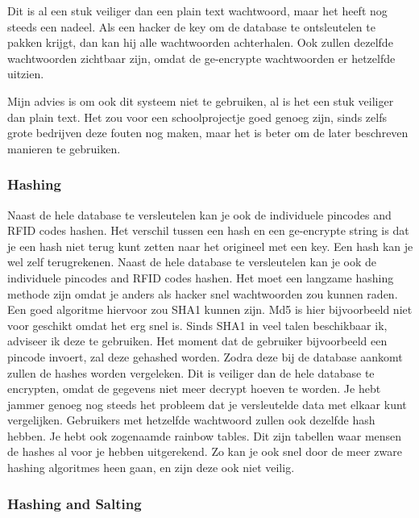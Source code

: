 \documentclass{article}
\begin{document}
Dit is al een stuk veiliger dan een plain text wachtwoord, maar het heeft nog steeds een nadeel.
Als een hacker de key om de database te ontsleutelen te pakken krijgt, dan kan hij alle wachtwoorden achterhalen.
Ook zullen dezelfde wachtwoorden zichtbaar zijn, omdat de ge-encrypte wachtwoorden er hetzelfde uitzien.

Mijn advies is om ook dit systeem niet te gebruiken, al is het een stuk veiliger dan plain text.
Het zou voor een schoolprojectje goed genoeg zijn, sinds zelfs grote bedrijven deze fouten nog maken, maar het is beter om de later beschreven manieren te gebruiken.

\newpage

\subsubsection{Hashing}

Naast de hele database te versleutelen kan je ook de individuele pincodes and RFID codes hashen.
Het verschil tussen een hash en een ge-encrypte string is dat je een hash niet terug kunt zetten naar het origineel met een key. 
Een hash kan je wel zelf terugrekenen.
Naast de hele database te versleutelen kan je ook de individuele pincodes and RFID codes hashen.
Het moet een langzame hashing methode zijn omdat je anders als hacker snel wachtwoorden zou kunnen raden.
Een goed algoritme hiervoor zou SHA1 kunnen zijn.
Md5 is hier bijvoorbeeld niet voor geschikt omdat het erg snel is.
Sinds SHA1 in veel talen beschikbaar ik, adviseer ik deze te gebruiken.
Het moment dat de gebruiker bijvoorbeeld een pincode invoert, zal deze gehashed worden.
Zodra deze bij de database aankomt zullen de hashes worden vergeleken.
Dit is veiliger dan de hele database te encrypten, omdat de gegevens niet meer decrypt hoeven te worden.
Je hebt jammer genoeg nog steeds het probleem dat je versleutelde data met elkaar kunt vergelijken.
Gebruikers met hetzelfde wachtwoord zullen ook dezelfde hash hebben.
Je hebt ook zogenaamde rainbow tables.
Dit zijn tabellen waar mensen de hashes al voor je hebben uitgerekend.
Zo kan je ook snel door de meer zware hashing algoritmes heen gaan, en zijn deze ook niet veilig.

\hfill

\centerline{  }

\newpage

\subsubsection{Hashing and Salting}
\end{document}
